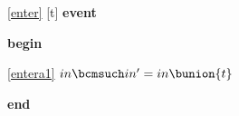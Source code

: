 \noindent \ref{enter} [t] \textbf{event}
\begin{block}
  \item   \textbf{begin}
  \begin{block}
  \item[ \eqref{entera1} ]$in \bcmsuch in' = in \bunion \{ t \} $ %
  \end{block}
  \item   \textbf{end} \\
\end{block}
